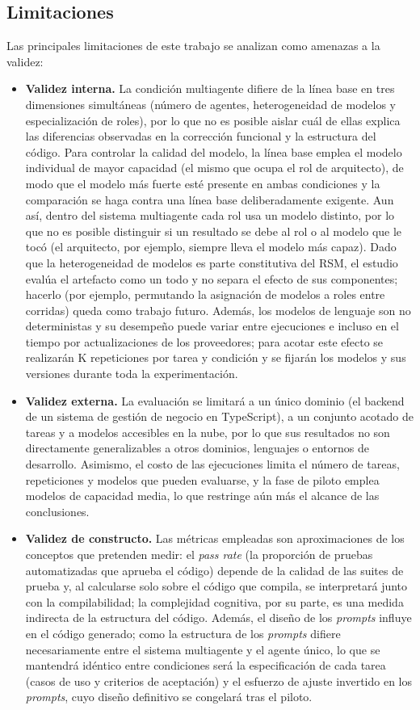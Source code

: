\subsection{Limitaciones}
Las principales limitaciones de este trabajo se analizan como amenazas a la validez:
\begin{itemize}
  \item \textbf{Validez interna.} La condición multiagente difiere de la línea base en tres dimensiones simultáneas (número de agentes, heterogeneidad de modelos y especialización de roles), por lo que no es posible aislar cuál de ellas explica las diferencias observadas en la corrección funcional y la estructura del código. Para controlar la calidad del modelo, la línea base emplea el modelo individual de mayor capacidad (el mismo que ocupa el rol de arquitecto), de modo que el modelo más fuerte esté presente en ambas condiciones y la comparación se haga contra una línea base deliberadamente exigente. Aun así, dentro del sistema multiagente cada rol usa un modelo distinto, por lo que no es posible distinguir si un resultado se debe al rol o al modelo que le tocó (el arquitecto, por ejemplo, siempre lleva el modelo más capaz). Dado que la heterogeneidad de modelos es parte constitutiva del RSM, el estudio evalúa el artefacto como un todo y no separa el efecto de sus componentes; hacerlo (por ejemplo, permutando la asignación de modelos a roles entre corridas) queda como trabajo futuro. Además, los modelos de lenguaje son no deterministas y su desempeño puede variar entre ejecuciones e incluso en el tiempo por actualizaciones de los proveedores; para acotar este efecto se realizarán K repeticiones por tarea y condición y se fijarán los modelos y sus versiones durante toda la experimentación.
  \item \textbf{Validez externa.} La evaluación se limitará a un único dominio (el backend de un sistema de gestión de negocio en TypeScript), a un conjunto acotado de tareas y a modelos accesibles en la nube, por lo que sus resultados no son directamente generalizables a otros dominios, lenguajes o entornos de desarrollo. Asimismo, el costo de las ejecuciones limita el número de tareas, repeticiones y modelos que pueden evaluarse, y la fase de piloto emplea modelos de capacidad media, lo que restringe aún más el alcance de las conclusiones.
  \item \textbf{Validez de constructo.} Las métricas empleadas son aproximaciones de los conceptos que pretenden medir: el \textit{pass rate} (la proporción de pruebas automatizadas que aprueba el código) depende de la calidad de las suites de prueba y, al calcularse solo sobre el código que compila, se interpretará junto con la compilabilidad; la complejidad cognitiva, por su parte, es una medida indirecta de la estructura del código. Además, el diseño de los \textit{prompts} influye en el código generado; como la estructura de los \textit{prompts} difiere necesariamente entre el sistema multiagente y el agente único, lo que se mantendrá idéntico entre condiciones será la especificación de cada tarea (casos de uso y criterios de aceptación) y el esfuerzo de ajuste invertido en los \textit{prompts}, cuyo diseño definitivo se congelará tras el piloto.
\end{itemize}
